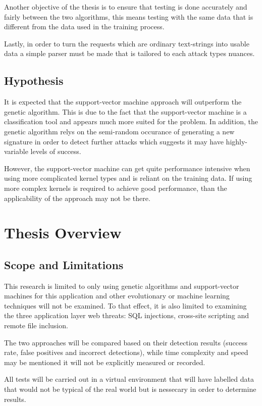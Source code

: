 Another objective of the thesis is to ensure that testing is done accurately and fairly between the two algorithms, this means testing with the same data that is different from the data used in the training process.

Lastly, in order to turn the requests which are ordinary text-strings into usable data a simple parser must be made that is tailored to each attack types nuances.

\subsection{Hypothesis}

It is expected that the support-vector machine approach will outperform the genetic algorithm.  This is due to the fact that the support-vector machine is a classification tool and appears much more suited for the problem.  In addition, the genetic algorithm relys on the semi-random occurance of generating a new signature in order to detect further attacks which suggests it may have highly-variable levels of success.

However, the support-vector machine can get quite performance intensive when using more complicated kernel types and is reliant on the training data.  If using more complex kernels is required to achieve good performance, than the applicability of the approach may not be there.




\section{Thesis Overview}
\subsection{Scope and Limitations}
This research is limited to only using genetic algorithms and support-vector machines for this application and other evolutionary or machine learning techniques will not be examined.  To that effect, it is also limited to examining the three application layer web threats: SQL injections, cross-site scripting and remote file inclusion.  

The two approaches will be compared based on their detection results (success rate, false positives and incorrect detections), while time complexity and speed may be mentioned it will not be explicitly measured or recorded.

All tests will be carried out in a virtual environment that will have labelled data that would not be typical of the real world but is nessecary in order to determine results.


